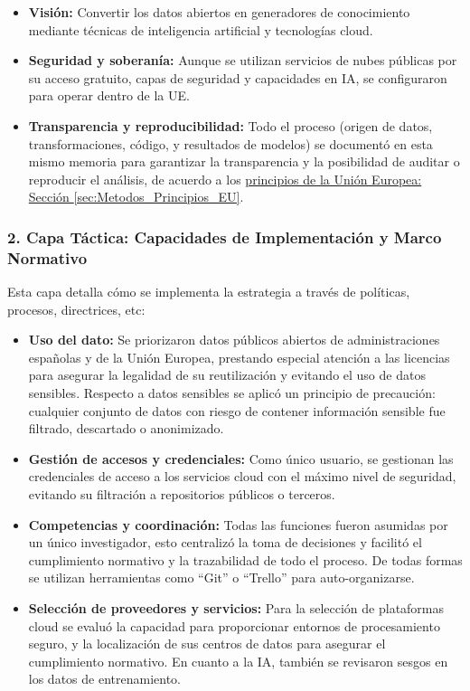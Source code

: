 \begin{itemize}
	\item \textbf{Visión:} Convertir los datos abiertos en generadores de conocimiento mediante técnicas de inteligencia artificial y tecnologías cloud.
	
	\item \textbf{Seguridad y soberanía:} Aunque se utilizan servicios de nubes públicas por su acceso gratuito, capas de seguridad y capacidades en IA, se configuraron para operar dentro de la UE.
	
	\item \textbf{Transparencia y reproducibilidad:} Todo el proceso (origen de datos, transformaciones, código, y resultados de modelos) se documentó en esta mismo memoria para garantizar la transparencia y la posibilidad de auditar o reproducir el análisis, de acuerdo a los \hyperref[sec:Metodos_Principios_EU]{principios de la Unión Europea: Sección \ref*{sec:Metodos_Principios_EU}}.
\end{itemize}


\subsubsection*{2. Capa Táctica: Capacidades de Implementación y Marco Normativo}

Esta capa detalla cómo se implementa la estrategia a través de políticas, procesos, directrices, etc:

\begin{itemize}
	\item \textbf{Uso del dato:} Se priorizaron datos públicos abiertos de administraciones españolas y de la Unión Europea, prestando especial atención a las licencias para asegurar la legalidad de su reutilización y evitando el uso de datos sensibles. Respecto a datos sensibles se aplicó un principio de precaución: cualquier conjunto de datos con riesgo de contener información sensible fue filtrado, descartado o anonimizado. 
	
	\item \textbf{Gestión de accesos y credenciales:} Como único usuario, se gestionan las credenciales de acceso a los servicios cloud con el máximo nivel de seguridad, evitando su filtración a repositorios públicos o terceros.
	
	\item \textbf{Competencias y coordinación:} Todas las funciones fueron asumidas por un único investigador, esto centralizó la toma de decisiones y facilitó el cumplimiento normativo y la trazabilidad de todo el proceso. De todas formas se utilizan herramientas como ``Git'' o ``Trello'' para auto-organizarse.
	
	\item \textbf{Selección de proveedores y servicios:} Para la selección de plataformas cloud se evaluó la capacidad para proporcionar entornos de procesamiento seguro, y la localización de sus centros de datos para asegurar el cumplimiento normativo. En cuanto a la IA, también se revisaron sesgos en los datos de entrenamiento.
\end{itemize}

